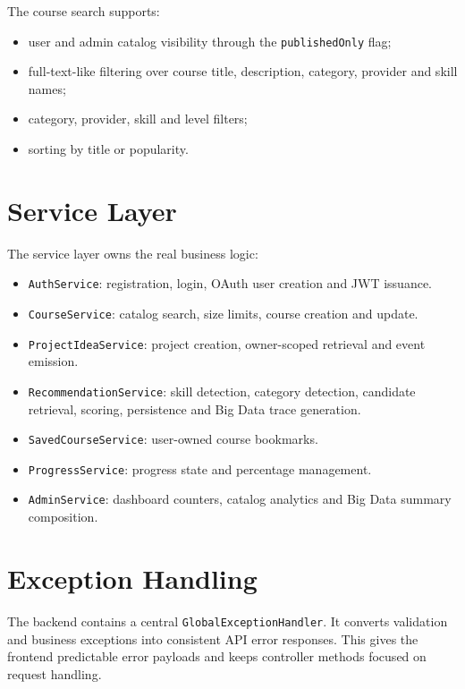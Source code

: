 \documentclass[12pt,a4paper]{report}
\begin{document}
The course search supports:
\begin{itemize}[leftmargin=*]
    \item user and admin catalog visibility through the \texttt{publishedOnly} flag;
    \item full-text-like filtering over course title, description, category, provider and skill names;
    \item category, provider, skill and level filters;
    \item sorting by title or popularity.
\end{itemize}

\section{Service Layer}
The service layer owns the real business logic:

\begin{itemize}[leftmargin=*]
    \item \texttt{AuthService}: registration, login, OAuth user creation and JWT issuance.
    \item \texttt{CourseService}: catalog search, size limits, course creation and update.
    \item \texttt{ProjectIdeaService}: project creation, owner-scoped retrieval and event emission.
    \item \texttt{RecommendationService}: skill detection, category detection, candidate retrieval, scoring, persistence and Big Data trace generation.
    \item \texttt{SavedCourseService}: user-owned course bookmarks.
    \item \texttt{ProgressService}: progress state and percentage management.
    \item \texttt{AdminService}: dashboard counters, catalog analytics and Big Data summary composition.
\end{itemize}

\section{Exception Handling}
The backend contains a central \texttt{GlobalExceptionHandler}. It converts validation and business exceptions into consistent API error responses. This gives the frontend predictable error payloads and keeps controller methods focused on request handling.

\end{document}
